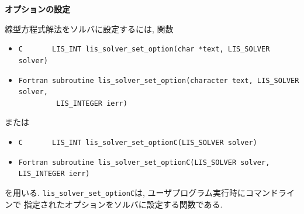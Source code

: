 \documentclass[a4paper]{jarticle}
\begin{document}
{{\noindent
{\bf オプションの設定}

線型方程式解法をソルバに設定するには, 関数 
\begin{itemize}
\item \verb|C       LIS_INT lis_solver_set_option(char *text, LIS_SOLVER solver)|
\item \verb|Fortran subroutine lis_solver_set_option(character text, LIS_SOLVER solver,|\\
      \verb|         LIS_INTEGER ierr)|
\end{itemize}
または
\begin{itemize}
\item \verb|C       LIS_INT lis_solver_set_optionC(LIS_SOLVER solver)|
\item \verb|Fortran subroutine lis_solver_set_optionC(LIS_SOLVER solver, LIS_INTEGER ierr)|
\end{itemize}
を用いる. 
\verb|lis_solver_set_optionC|は, ユーザプログラム実行時にコマンドラインで
指定されたオプションをソルバに設定する関数である. 

}}
\end{document}
